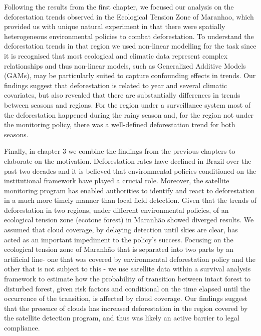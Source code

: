 Following the results from the first chapter, we focused our analysis on the deforestation trends observed in the Ecological Tension Zone of Maranhao, which provided us with unique natural experiment in that there were spatially heterogeneous environmental policies to combat deforestation. To understand the deforestation trends in that region we used non-linear modelling for the task since it is recognised that most ecological and climatic data represent complex relationships and thus non-linear models, such as Generalized Additive Models (GAMs), may be particularly suited to capture confounding effects in trends. Our findings suggest that deforestation is related to year and several climatic covariates, but also revealed that there are substantially differences in trends between seasons and regions. For the region under a surveillance system most of the deforestation happened during the rainy season and, for the region not under the monitoring policy, there was a well-defined deforestation trend for both seasons. 

Finally, in chapter 3 we combine the findings from the previous chapters to elaborate on the motivation. Deforestation rates have declined in Brazil over the past two decades and it is believed that environmental policies conditioned on the institutional framework have played a crucial role. Moreover, the satellite monitoring program has enabled authorities to identify and react to deforestation in a much more timely manner than local field detection. Given that the trends of deforestation in two regions, under different environmental policies, of an ecological tension zone (ecotone forest) in Maranhão showed diverged results. We assumed that cloud coverage, by delaying detection until skies are clear, has acted as an important impediment to the policy's success. Focusing on the ecological tension zone of Maranhão that is separated into two parts by an artificial line- one that was covered by environmental deforestation policy and the other that is not subject to this -  we use satellite data within a survival analysis framework to estimate how the probability of transition between intact forest to disturbed forest, given risk factors and conditional on the time elapsed until the occurrence of the transition, is affected by cloud coverage. Our findings suggest that the presence of clouds has increased deforestation in the region covered by the satellite detection program, and thus was likely an active barrier to legal compliance. 


